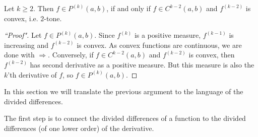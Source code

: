 \begin{lause}\label{k-tone_smooth}
	Let $k \geq 2$. Then $f \in P^{(k)}(a, b)$, if and only if $f \in C^{k - 2}(a, b)$ and $f^{(k - 2)}$ is convex, i.e. $2$-tone.
\end{lause}
\begin{proof}[``Proof"]
	Let $f \in P^{(k)}(a, b)$. Since $f^{(k)}$ is a positive measure, $f^{(k - 1)}$ is increasing and $f^{(k - 2)}$ is convex. As convex functions are continuous, we are done with $\Rightarrow$. Conversely, if $f \in C^{k - 2}(a, b)$ and $f^{(k - 2)}$ is convex, then $f^{(k - 2)}$ has second derivative as a positive measure. But this measure is also the $k$'th derivative of $f$, so $f \in P^{(k)}(a, b)$.
\end{proof}

In this section we will translate the previous argument to the language of the divided differences.

The first step is to connect the divided differences of a function to the divided differences (of one lower order) of the derivative.

